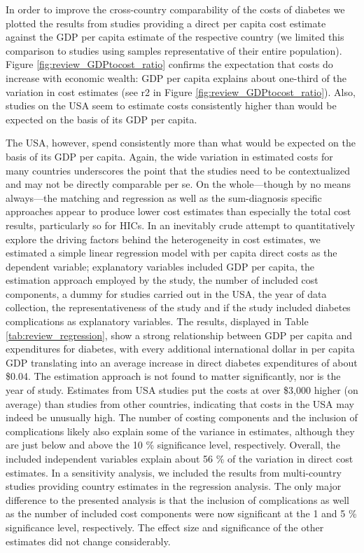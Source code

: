 In order to improve the cross-country comparability of the costs of diabetes we plotted the results from studies providing a direct per capita cost estimate against the \ac{GDP} per capita estimate of the respective country (we limited this comparison to studies using samples representative of their entire population). Figure \ref{fig:review_GDPtocost_ratio} confirms the expectation that costs do increase with economic wealth: \ac{GDP} per capita explains about one-third of the variation in cost estimates (see r2 in Figure \ref{fig:review_GDPtocost_ratio}). Also, studies on the USA seem to estimate costs consistently higher than would be expected on the basis of its \ac{GDP} per capita. 

The USA, however, spend consistently more than what would be expected on the basis of its \ac{GDP} per capita. Again, the wide variation in estimated costs for many countries underscores the point that the studies need to be contextualized and may not be directly comparable per se. On the whole---though by no means always---the matching and regression as well as the sum-diagnosis specific approaches appear to produce lower cost estimates than especially the total cost results, particularly so for \acp{HIC}. In an inevitably crude attempt to quantitatively explore the driving factors behind the heterogeneity in cost estimates, we estimated a simple linear regression model with per capita direct costs as the dependent variable; explanatory variables included \ac{GDP} per capita, the estimation approach employed by the study, the number of included cost components, a dummy for studies carried out in the USA, the year of data collection, the representativeness of the study and if the study included diabetes complications as explanatory variables. The results, displayed in Table \ref{tab:review_regression}, show a strong relationship between \ac{GDP} per capita and expenditures for diabetes, with every additional international dollar in per capita \ac{GDP} translating into an average increase in direct diabetes expenditures of about \$0.04. The estimation approach is not found to matter significantly, nor is the year of study. Estimates from USA studies put the costs at over \$3,000 higher (on average) than studies from other countries, indicating that costs in the USA may indeed be unusually high. The number of costing components and the inclusion of complications likely also explain some of the variance in estimates, although they are just below and above the 10 \% significance level, respectively. Overall, the included independent variables explain about 56 \% of the variation in direct cost estimates. In a sensitivity analysis, we included the results from multi-country
studies providing country estimates in the regression analysis. The
only major difference to the presented analysis is that the inclusion of
complications as well as the number of included cost components
were now significant at the 1 and 5 \% significance level, respectively.
The effect size and significance of the other estimates did not change
considerably.


